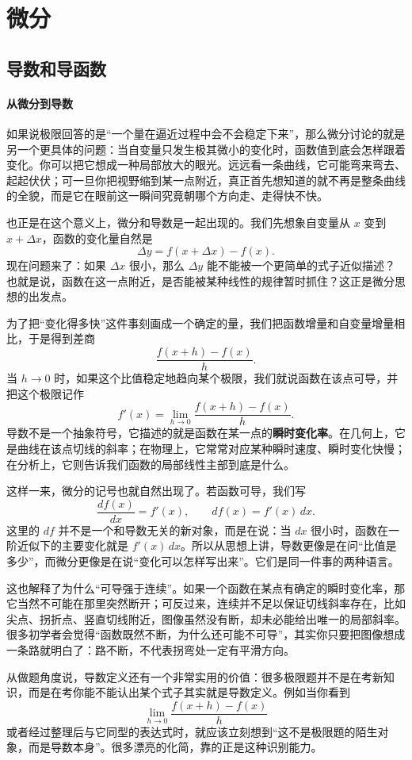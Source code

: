 \documentclass[UTF8]{ctexbook}
\begin{document}
\section{微分}
\subsection{导数和导函数}
\paragraph{从微分到导数}
如果说极限回答的是“一个量在逼近过程中会不会稳定下来”，那么微分讨论的就是另一个更具体的问题：当自变量只发生极其微小的变化时，函数值到底会怎样跟着变化。你可以把它想成一种局部放大的眼光。远远看一条曲线，它可能弯来弯去、起起伏伏；可一旦你把视野缩到某一点附近，真正首先想知道的就不再是整条曲线的全貌，而是它在眼前这一瞬间究竟朝哪个方向走、走得快不快。

也正是在这个意义上，微分和导数是一起出现的。我们先想象自变量从 $x$ 变到 $x+\Delta x$，函数的变化量自然是
\[
\Delta y=f(x+\Delta x)-f(x).
\]
现在问题来了：如果 $\Delta x$ 很小，那么 $\Delta y$ 能不能被一个更简单的式子近似描述？也就是说，函数在这一点附近，是否能被某种线性的规律暂时抓住？这正是微分思想的出发点。

为了把“变化得多快”这件事刻画成一个确定的量，我们把函数增量和自变量增量相比，于是得到差商
\[
\frac{f(x+h)-f(x)}{h}.
\]
当 $h\to 0$ 时，如果这个比值稳定地趋向某个极限，我们就说函数在该点可导，并把这个极限记作
\[
f'(x)=\lim_{h\to 0}\frac{f(x+h)-f(x)}{h}.
\]
导数不是一个抽象符号，它描述的就是函数在某一点的\textbf{瞬时变化率}。在几何上，它是曲线在该点切线的斜率；在物理上，它常常对应某种瞬时速度、瞬时变化快慢；在分析上，它则告诉我们函数的局部线性主部到底是什么。

这样一来，微分的记号也就自然出现了。若函数可导，我们写
\[
\frac{df(x)}{dx}=f'(x),
\qquad
 df(x)=f'(x)\,dx.
\]
这里的 $df$ 并不是一个和导数无关的新对象，而是在说：当 $dx$ 很小时，函数在一阶近似下的主要变化就是 $f'(x)\,dx$。所以从思想上讲，导数更像是在问“比值是多少”，而微分更像是在说“变化可以怎样写出来”。它们是同一件事的两种语言。

这也解释了为什么“可导强于连续”。如果一个函数在某点有确定的瞬时变化率，那它当然不可能在那里突然断开；可反过来，连续并不足以保证切线斜率存在，比如尖点、拐折点、竖直切线附近，图像虽然没有断，却未必能给出唯一的局部斜率。很多初学者会觉得“函数既然不断，为什么还可能不可导”，其实你只要把图像想成一条路就明白了：路不断，不代表拐弯处一定有平滑方向。

从做题角度说，导数定义还有一个非常实用的价值：很多极限题并不是在考新知识，而是在考你能不能认出某个式子其实就是导数定义。例如当你看到
\[
\lim_{h\to 0}\frac{f(x+h)-f(x)}{h}
\]
或者经过整理后与它同型的表达式时，就应该立刻想到“这不是极限题的陌生对象，而是导数本身”。很多漂亮的化简，靠的正是这种识别能力。
\end{document}
